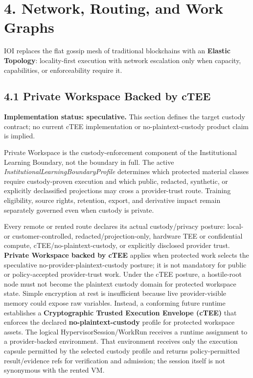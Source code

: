 \documentclass[
  11pt,
]{article}
\begin{document}
\hypertarget{network-routing-and-work-graphs}{%
\section{4. Network, Routing, and Work
Graphs}\label{network-routing-and-work-graphs}}

IOI replaces the flat gossip mesh of traditional blockchains with an
\textbf{Elastic Topology}: locality-first execution with network
escalation only when capacity, capabilities, or enforceability require
it.

\hypertarget{private-workspace-backed-by-ctee}{%
\subsection{4.1 Private Workspace Backed by
cTEE}\label{private-workspace-backed-by-ctee}}

\textbf{Implementation status: speculative.} This section defines the target
custody contract; no current cTEE implementation or no-plaintext-custody
product claim is implied.

Private Workspace is the custody-enforcement component of the
Institutional Learning Boundary, not the boundary in full. The active
\emph{InstitutionalLearningBoundaryProfile} determines which protected
material classes require custody-proven execution and which public, redacted,
synthetic, or explicitly declassified projections may cross a provider-trust
route. Training eligibility, source rights, retention, export, and derivative
impact remain separately governed even when custody is private.

Every remote or rented route declares its actual custody/privacy posture:
local- or customer-controlled, redacted/projection-only, hardware TEE or
confidential compute, cTEE/no-plaintext-custody, or explicitly disclosed
provider trust. \textbf{Private Workspace backed by cTEE} applies when
protected work selects the speculative no-provider-plaintext-custody posture;
it is not mandatory for public or policy-accepted provider-trust work. Under
the cTEE posture, a hostile-root node must not become the plaintext custody
domain for protected workspace state. Simple encryption at rest is
insufficient because live provider-visible memory could expose raw variables.
Instead, a conforming future runtime establishes a \textbf{Cryptographic Trusted
Execution Envelope (cTEE)} that enforces the declared
\textbf{no-plaintext-custody} profile for protected workspace assets. The
logical HypervisorSession/WorkRun receives a runtime assignment to a
provider-backed environment. That environment receives only the execution
capsule permitted by the selected custody profile and returns policy-permitted
result/evidence refs for verification and admission; the session itself is not
synonymous with the rented VM.
\end{document}
